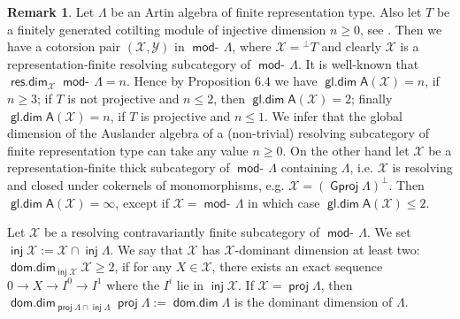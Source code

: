 \documentclass[oneside, a4paper,reqno]{amsart}
\numberwithin{equation}{section}
\theoremstyle{definition}
\newtheorem{rem}[thm]{Remark}
\begin{document}
\begin{rem} Let $\Lambda$ be an Artin algebra of finite
representation type.  Also let $T$ be a finitely generated cotilting
module of injective dimension $n \geq 0$, see
\cite{AR:applications}. Then we have a cotorsion pair $({\mathcal X},{\mathcal Y})$ in
$\operatorname*{\mathsf{mod}-\!}\Lambda$, where ${\mathcal X} = {^{\bot}}T$ and clearly ${\mathcal X}$ is a
representation-finite resolving subcategory of $\operatorname*{\mathsf{mod}-\!}\Lambda$. It is
well-known that $\operatorname*{\mathsf{res.dim}}_{\mathcal X}\operatorname*{\mathsf{mod}-\!}\Lambda = n$. Hence by Proposition
$6.4$ we have $\operatorname*{\mathsf{gl.dim}}\mathsf{A}({\mathcal X}) = n$, if $n \geq 3$; if $T$ is not
projective and $n \leq 2$, then $\operatorname*{\mathsf{gl.dim}}\mathsf{A}({\mathcal X}) = 2$; finally
$\operatorname*{\mathsf{gl.dim}}\mathsf{A}({\mathcal X}) = n$, if $T$ is projective and $n \leq 1$. We
infer that the global dimension of the Auslander algebra of a
(non-trivial) resolving subcategory of finite representation type
can take any value $n \geq 0$. On the other hand let ${\mathcal X}$ be a
representation-finite thick subcategory of $\operatorname*{\mathsf{mod}-\!}\Lambda$ containing
$\Lambda$, i.e. ${\mathcal X}$ is resolving and closed under cokernels of
monomorphisms, e.g. ${\mathcal X} = ({\operatorname{\mathsf{Gproj}}\nolimits}\Lambda)^{\bot}$. Then $\operatorname*{\mathsf{gl.dim}}
\mathsf{A}({\mathcal X}) = \infty$, except if ${\mathcal X} = \operatorname*{\mathsf{mod}-\!}\Lambda$ in which
case $\operatorname*{\mathsf{gl.dim}}\mathsf{A}({\mathcal X}) \leq 2$.
\end{rem}

Let ${\mathcal X}$ be a resolving contravariantly finite subcategory of
$\operatorname*{\mathsf{mod}-\!}\Lambda$. We set $\operatorname*{\mathsf{inj}}{\mathcal X} := {\mathcal X} \cap \operatorname*{\mathsf{inj}}\Lambda$. We say that
${\mathcal X}$ has  ${\mathcal X}$-dominant dimension at least two: $\operatorname*{\mathsf{dom.dim}}_{\operatorname*{\mathsf{inj}}{\mathcal X}}{\mathcal X} \geq
2$, if for any $X \in {\mathcal X}$, there exists an exact sequence $0 {\longrightarrow} X
{\longrightarrow} I^{0} {\longrightarrow} I^{1}$ where the $I^{i}$ lie in $\operatorname*{\mathsf{inj}}{\mathcal X}$. If ${\mathcal X} =
\operatorname*{\mathsf{proj}}\Lambda$, then $\operatorname*{\mathsf{dom.dim}}_{\operatorname*{\mathsf{proj}}\Lambda\cap\operatorname*{\mathsf{inj}}\Lambda}\operatorname*{\mathsf{proj}}\Lambda
:= \operatorname*{\mathsf{dom.dim}}\Lambda$ is the dominant dimension of $\Lambda$.
\end{document}
